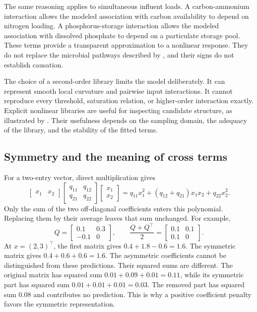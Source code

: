 The same reasoning applies to simultaneous influent loads. A carbon-ammonium interaction allows the modeled association with carbon availability to depend on nitrogen loading. A phosphorus-storage interaction allows the modeled association with dissolved phosphate to depend on a particulate storage pool. These terms provide a transparent approximation to a nonlinear response. They do not replace the microbial pathways described by \citet{Henze1999}, and their signs do not establish causation.

The choice of a second-order library limits the model deliberately. It can represent smooth local curvature and pairwise input interactions. It cannot reproduce every threshold, saturation relation, or higher-order interaction exactly. Explicit nonlinear libraries are useful for inspecting candidate structure, as illustrated by \citet{Brunton2016}. Their usefulness depends on the sampling domain, the adequacy of the library, and the stability of the fitted terms.

\subsection{Symmetry and the meaning of cross terms}

For a two-entry vector, direct multiplication gives
\begin{equation}
\label{eq:icsor_scalar_quadratic}
\begin{bmatrix}x_1&x_2\end{bmatrix}
\begin{bmatrix}q_{11}&q_{12}\\q_{21}&q_{22}\end{bmatrix}
\begin{bmatrix}x_1\\x_2\end{bmatrix}
=q_{11}x_1^2+(q_{12}+q_{21})x_1x_2+q_{22}x_2^2.
\end{equation}
Only the sum of the two off-diagonal coefficients enters this polynomial. Replacing them by their average leaves that sum unchanged. For example,
\begin{equation}
\label{eq:icsor_symmetry_numbers}
Q=\begin{bmatrix}0.1&0.3\\-0.1&0\end{bmatrix},
\qquad
\frac{Q+Q^\top}{2}=\begin{bmatrix}0.1&0.1\\0.1&0\end{bmatrix}.
\end{equation}
At \(x=(2,3)^\top\), the first matrix gives \(0.4+1.8-0.6=1.6\). The symmetric matrix gives \(0.4+0.6+0.6=1.6\). The asymmetric coefficients cannot be distinguished from these predictions. Their squared sums are different. The original matrix has squared sum \(0.01+0.09+0.01=0.11\), while its symmetric part has squared sum \(0.01+0.01+0.01=0.03\). The removed part has squared sum 0.08 and contributes no prediction. This is why a positive coefficient penalty favors the symmetric representation.

